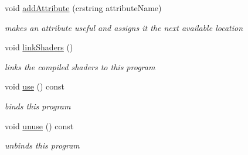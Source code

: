 \begin{DoxyCompactItemize}
void \hyperlink{classnta_1_1GLSLProgram_a708c47abebb9ca01b0eed4d1e711cef7}{add\+Attribute} (crstring attribute\+Name)
\begin{DoxyCompactList}\small\item\em makes an attribute useful and assigns it the next available location \end{DoxyCompactList}\item 
\mbox{\label{classnta_1_1GLSLProgram_aa1d946246f4b04ba0b947362152ec1c0}} 
void \hyperlink{classnta_1_1GLSLProgram_aa1d946246f4b04ba0b947362152ec1c0}{link\+Shaders} ()
\begin{DoxyCompactList}\small\item\em links the compiled shaders to this program \end{DoxyCompactList}\item 
\mbox{\label{classnta_1_1GLSLProgram_ac5c8fffb04aec82913b78e35db9ea31f}} 
void \hyperlink{classnta_1_1GLSLProgram_ac5c8fffb04aec82913b78e35db9ea31f}{use} () const
\begin{DoxyCompactList}\small\item\em binds this program \end{DoxyCompactList}\item 
\mbox{\label{classnta_1_1GLSLProgram_a3153b4281ab2b6fcf0017c90bbd199af}} 
void \hyperlink{classnta_1_1GLSLProgram_a3153b4281ab2b6fcf0017c90bbd199af}{unuse} () const
\begin{DoxyCompactList}\small\item\em unbinds this program \end{DoxyCompactList}\end{DoxyCompactItemize}
